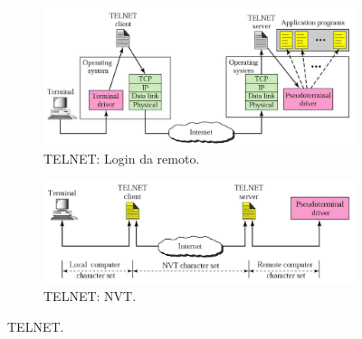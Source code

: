 \documentclass[11pt, italian, openany]{book}
\begin{document}
\begin{sloppypar}
\begin{figure}[h!]
	\begin{subfigure}[t]{0.49 \linewidth} \centering
		\includegraphics[scale=0.25]{images/telnet.png}
		\caption{TELNET: Login da remoto.}
	\end{subfigure}
	\begin{subfigure}[t]{0.49 \linewidth} \centering
		\includegraphics[scale=0.25]{images/telnet-nvt.png}
		\caption{TELNET: NVT.}
	\end{subfigure}
	\caption{TELNET.}
	\label{fig:telnet}
\end{figure}


\end{sloppypar}
\end{document}
